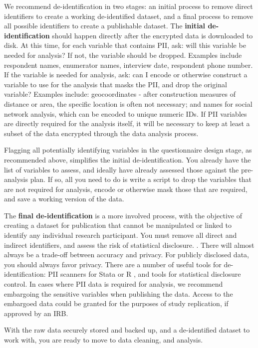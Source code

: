 We recommend de-identification in two stages: an initial process to remove direct identifiers to create a working de-identified dataset, and a final process to remove all possible identifiers to create a publishable dataset.
The \textbf{initial de-identification} should happen directly after the encrypted data is downloaded to disk. At this time, for each variable that contains PII, ask: will this variable be needed for analysis?
If not, the variable should be dropped. Examples include respondent names, enumerator names, interview date, respondent phone number.
If the variable is needed for analysis, ask: can I encode or otherwise construct a variable to use for the analysis that masks the PII, and drop the original variable?
Examples include: geocoordinates - after construction measures of distance or area, the specific location is often not necessary; and names for social network analysis, which can be encoded to unique numeric IDs.
If PII variables are directly required for the analysis itself, it will be necessary to keep at least a subset of the data encrypted through the data analysis process.

Flagging all potentially identifying variables in the questionnaire design stage, as recommended above, simplifies the initial de-identification.
You already have the list of variables to assess, and ideally have already assessed those against the pre-analysis plan.
If so, all you need to do is write a script to drop the variables that are not required for analysis, encode or otherwise mask those that are required, and save a working version of the data.

The \textbf{final de-identification} is a more involved process, with the objective of creating a dataset for publication that cannot be manipulated or linked to identify any individual research participant.
You must remove all direct and indirect identifiers, and assess the risk of statistical disclosure. .
There will almost always be a trade-off between accuracy and privacy. For publicly disclosed data, you should always favor privacy.
There are a number of useful tools for de-identification: PII scanners for Stata  or R ,
and tools for statistical disclosure control. 
In cases where PII data is required for analysis, we recommend embargoing the sensitive variables when publishing the data.
Access to the embargoed data could be granted for the purposes of study replication, if approved by an IRB.



With the raw data securely stored and backed up, and a de-identified dataset to work with, you are ready to move to data cleaning, and analysis.

